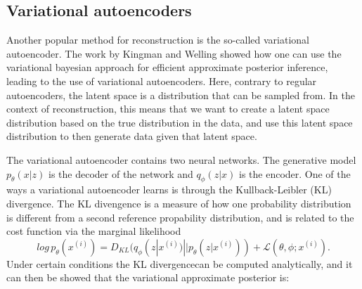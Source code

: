 \subsection*{Variational autoencoders}
Another popular method for reconstruction is the so-called variational autoencoder. The work by Kingman and Welling \cite{VAE} showed how
one can use the variational bayesian approach for efficient approximate posterior inference, leading to the use of variational autoencoders.
Here, contrary to regular autoencoders, the latent space is a distribution that can be sampled from. In the context of reconstruction, this means that
we want to create a latent space distribution based on the true distribution in the data, and use this latent space distribution to then generate
data given that latent space. \par
The variational autoencoder contains two neural networks. The generative model $p_{\theta}(x|z)$ is the decoder of the network and 
$q_{\phi}(z|x)$ is the encoder. 
One of the ways a variational autoencoder learns is through the Kullback-Leibler (KL) divergence\cite{MR39968}. The KL divengence is a measure of how 
one probability distribution is different from a second reference propability distribution, and is related to the cost function via the marginal likelihood
\begin{equation}
    log\, p_{\theta}(x^{(i)}) = D_{KL}(q_{\phi}(z|x^{(i)})||p_{\theta}(z|x^{(i)})) + \mathcal{L}(\theta, \phi;x^{(i)}).
\end{equation}
Under certain conditions\cite{VAE} the 
KL divergencecan be computed analytically, and it can then be showed\cite{VAE} that the variational approximate posterior is:

